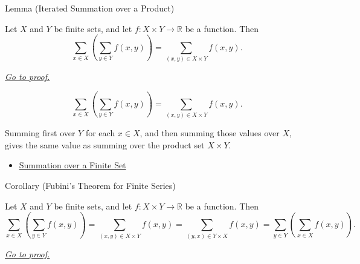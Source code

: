 \begin{lemmabox}{Lemma (Iterated Summation over a Product)}
\begin{lemma}
\label{lem:iterated-summation-over-product}

Let \(X\) and \(Y\) be finite sets, and let
\(f:X\times Y\to\mathbb{R}\) be a function. Then
\[
  \sum_{x\in X}
  \left(
    \sum_{y\in Y} f(x,y)
  \right)
  =
  \sum_{(x,y)\in X\times Y} f(x,y).
\]

\smallskip
\noindent
\hyperref[prf:iterated-summation-over-product]{\textit{Go to proof.}}
\end{lemma}
\end{lemmabox}

\begin{remark*}
\[
  \sum_{x\in X}\left(\sum_{y\in Y}f(x,y)\right)
  =
  \sum_{(x,y)\in X\times Y}f(x,y).
\]
\end{remark*}

\begin{remark*}[Interpretation]
Summing first over \(Y\) for each \(x\in X\), and then summing those
values over \(X\), gives the same value as summing over the product set
\(X\times Y\).
\end{remark*}

\begin{dependencies}
\begin{itemize}
  \item \hyperref[def:summation-over-finite-set]{Summation over a Finite Set}
\end{itemize}
\end{dependencies}

\begin{corollarybox}{Corollary (Fubini's Theorem for Finite Series)}
\begin{corollary}
\label{cor:fubini-theorem-finite-series}

Let \(X\) and \(Y\) be finite sets, and let
\(f:X\times Y\to\mathbb{R}\) be a function. Then
\[
  \sum_{x\in X}
  \left(
    \sum_{y\in Y} f(x,y)
  \right)
  =
  \sum_{(x,y)\in X\times Y} f(x,y)
  =
  \sum_{(y,x)\in Y\times X} f(x,y)
  =
  \sum_{y\in Y}
  \left(
    \sum_{x\in X} f(x,y)
  \right).
\]

\smallskip
\noindent
\hyperref[prf:fubini-theorem-finite-series]{\textit{Go to proof.}}
\end{corollary}
\end{corollarybox}

